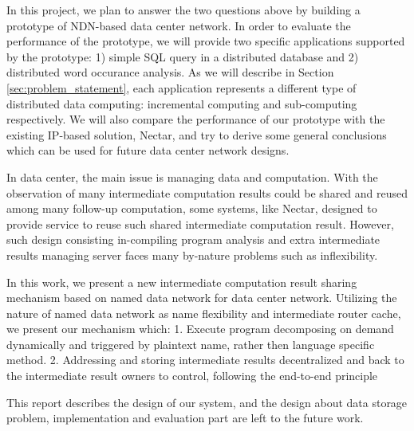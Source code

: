 In this project, we plan to answer the two questions above by building a
prototype of NDN-based data center network.  In order to evaluate the
performance of the prototype, we will provide two specific applications
supported by the prototype: 1) simple SQL query in a distributed database and 2)
distributed word occurance analysis.  As we will describe in Section
\ref{sec:problem_statement}, each application represents a different type of
distributed data computing: incremental computing and sub-computing
respectively.  We will also compare the performance of our prototype with the
existing IP-based solution, Nectar, and try to derive some general conclusions
which can be used for future data center network designs.



In data center, the main issue is managing data and computation. With the observation 
of many intermediate computation results could be shared and reused among many follow-up 
computation, some systems, like Nectar, designed to provide service to reuse such shared 
intermediate computation result. However, such design consisting in-compiling program 
analysis and extra intermediate results managing server faces many by-nature problems such as inflexibility.
 
In this work, we present a new intermediate computation result sharing mechanism based on named data network for data center network. Utilizing the nature of named data network as name flexibility and intermediate router cache, we present our mechanism which:
  1. Execute program decomposing on demand dynamically and triggered by plaintext name, rather then language specific method.
  2. Addressing and storing intermediate results decentralized and back to the intermediate result owners to control, following the end-to-end principle

This report describes the design of our system, and the design about data storage problem, 
implementation and evaluation part are left to the future work.
